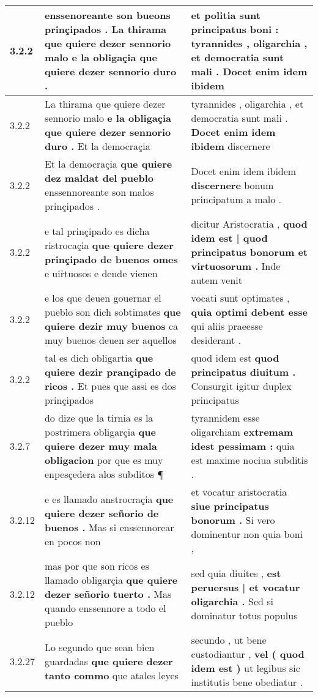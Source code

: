\begin{tabular}{|p{1cm}|p{6.5cm}|p{6.5cm}|}
3.2.2 & enssenoreante son bueons prinçipados . \textbf{ La thirama que quiere dezer sennorio malo } e la obligaçia que quiere dezer sennorio duro . & et politia sunt principatus boni : \textbf{ tyrannides , oligarchia , et democratia sunt mali . } Docet enim idem ibidem \\\hline
3.2.2 & La thirama que quiere dezer sennorio malo \textbf{ e la obligaçia que quiere dezer sennorio duro . } Et la democraçia & tyrannides , oligarchia , et democratia sunt mali . \textbf{ Docet enim idem ibidem } discernere \\\hline
3.2.2 & Et la democraçia \textbf{ que quiere dez maldat del pueblo } enssennoreante son malos prinçipados . & Docet enim idem ibidem \textbf{ discernere } bonum principatum a malo . \\\hline
3.2.2 & e tal prinçipado es dicħa ristrocaçia \textbf{ que quiere dezer prinçipado de buenos omes } e uir̉tuosos e dende vienen & dicitur Aristocratia , \textbf{ quod idem est | quod principatus bonorum et virtuosorum . } Inde autem venit \\\hline
3.2.2 & e los que deuen gouernar el pueblo son dich sobtimates \textbf{ que quiere dezir muy buenos } ca muy buenos deuen ser aquellos & vocati sunt optimates , \textbf{ quia optimi debent esse } qui aliis praeesse desiderant . \\\hline
3.2.2 & tal es dich obligartia \textbf{ que quiere dezir prançipado de ricos . } Et pues que assi es dos prinçipados & quod idem est \textbf{ quod principatus diuitum . } Consurgit igitur duplex principatus \\\hline
3.2.7 & do dize que la tirnia es la postrimera obligarçia \textbf{ que quiere dezer muy mala obligacion } por que es muy enpesçedera alos subditos ¶ & tyrannidem esse oligarchiam \textbf{ extremam idest pessimam : } quia est maxime nociua subditis . \\\hline
3.2.12 & e es llamado anstrocraçia \textbf{ que quiere dezer señorio de buenos . } Mas si enssennorear en pocos non & et vocatur aristocratia \textbf{ siue principatus bonorum . } Si vero dominentur non quia boni , \\\hline
3.2.12 & mas por que son ricos es llamado obligarçia \textbf{ que quiere dezer señorio tuerto . } Mas quando enssennore a todo el pueblo & sed quia diuites , \textbf{ est peruersus | et vocatur oligarchia . } Sed si dominatur totus populus \\\hline
3.2.27 & Lo segundo que sean bien guardadas \textbf{ que quiere dezer tanto commo } que atales leyes & secundo , ut bene custodiantur , \textbf{ vel ( quod idem est ) } ut legibus sic institutis bene obediatur . \\\hline

\end{tabular}
